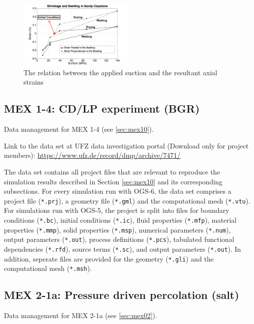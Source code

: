 \begin{figure}[!ht]
\centering
\includegraphics[width=0.5\textwidth]{figures/Amir_Shrinkage_Strain_Data.png}
\caption{The relation between the applied suction and the resultant axial strains}
\label{fig:Amir_Shrinkage_Strain_Data}
\end{figure}

\subsection{MEX 1-4: CD/LP experiment (BGR)}

Data management for MEX 1-4 (see \ref{sec:mex10}).

Link to the data set at UFZ data investigation portal (Download only for project members):
\hyperlink{https://www.ufz.de/record/dmp/archive/7471/}{https://www.ufz.de/record/dmp/archive/7471/}

The data set contains all project files that are relevant to reproduce the simulation results described in Section \ref{sec:mex10} and its corresponding subsections. For every simulation run with OGS-6, the data set comprises a project file (\texttt{*.prj}), a geometry file (\texttt{*.gml}) and the computational mesh (\texttt{*.vtu}). For simulations run with OGS-5, the project is split into files for boundary conditions (\texttt{*.bc}), initial conditions (\texttt{*.ic}), fluid properties (\texttt{*.mfp}), material properties (\texttt{*.mmp}), solid properties (\texttt{*.msp}), numerical parameters (\texttt{*.num}), output parameters (\texttt{*.out}), process definitions (\texttt{*.pcs}), tabulated functional dependencies (\texttt{*.rfd}), source terms (\texttt{*.sc}), and output parameters (\texttt{*.out}). In addition, seperate files are provided for the geometry (\texttt{*.gli}) and the computational mesh (\texttt{*.msh}).

\subsection{MEX 2-1a: Pressure driven percolation (salt)}

Data management for MEX 2-1a (see \ref{sec:mex02}).

